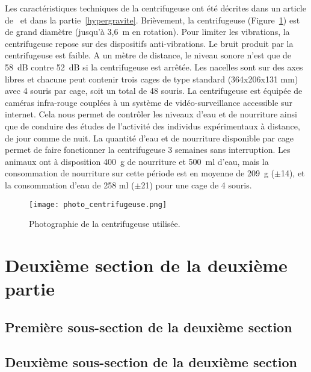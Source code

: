 			Les caractéristiques techniques de la centrifugeuse ont été décrites dans un article de~\cite{jamon_ground-based_2008} et dans la partie~\ref{hypergravite}. Brièvement, la centrifugeuse (Figure~\ref{photo_centrifugeuse}) est de grand diamètre (jusqu'à 3,6~m en rotation). Pour limiter les vibrations, la centrifugeuse repose sur des dispositifs anti-vibrations. Le bruit produit par la centrifugeuse est faible. A un mètre de distance, le niveau sonore n'est que de 58~dB contre 52~dB si la centrifugeuse est arrêtée. Les nacelles sont sur des axes libres et chacune peut contenir trois cages de type standard (364x206x131 mm) avec 4 souris par cage, soit un total de 48 souris. La centrifugeuse est équipée de caméras infra-rouge couplées à un système de vidéo-surveillance accessible sur internet. Cela nous permet de contrôler les niveaux d'eau et de nourriture ainsi que de conduire des études de l'activité des individus expérimentaux à distance, de jour comme de nuit. La quantité d'eau et de nourriture disponible par cage permet de faire fonctionner la centrifugeuse 3 semaines sans interruption. Les animaux ont à disposition 400~g de nourriture et 500~ml d'eau, mais la consommation de nourriture sur cette période est en moyenne de 209~g ($\pm$14), et la consommation d'eau de 258 ml ($\pm$21) pour une cage de 4 souris.
		
			\begin{figure}[h!tbp]
				\vspace{0.5cm}
				\setcapindent{2em}
				\centering
				\texttt{[image: photo\_centrifugeuse.png]}
				\caption[Photographie de la centrifugeuse]{Photographie de la centrifugeuse utilisée.}
				\label{photo_centrifugeuse}
			\end{figure}

			\lipsum[2]

\section{Deuxième section de la deuxième partie}

	\lipsum[3]

	\subsection{Première sous-section de la deuxième section}

		\lipsum[4]

	\subsection[Sous-sous section 2]{Deuxième sous-section de la deuxième section} %

